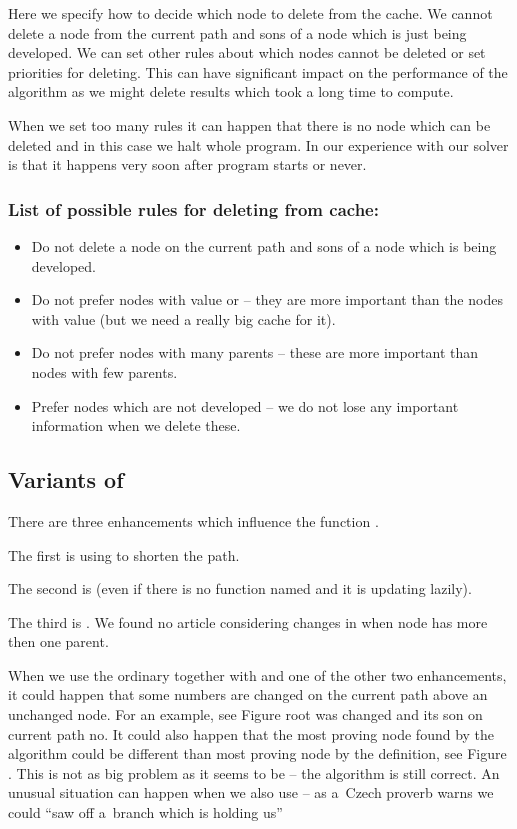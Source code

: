 Here we specify how to decide which node to delete from the cache. We cannot
delete a node from the current path and sons of a node which is just being
developed. We can set other rules about which nodes cannot be deleted or set
priorities for deleting. This can have significant impact on the performance of
the algorithm as we might delete results which took a long time to compute.

When we set too many rules it can happen that there is no node which can be
deleted and in this case we halt whole program. In our experience with our
solver is that it happens very soon after program starts or never.

\subsubsection{List of possible rules for deleting from cache:}
\begin{itemize}
\item Do not delete a node on the current path and sons of a node which is being developed.
\item Do not prefer nodes with value  or  -- they are 
      more important than the nodes with value  (but we need a really big
      cache for it).
\item Do not prefer nodes with many parents -- these are more important than nodes
      with few parents.
\item Prefer nodes which are not developed -- we do not lose any important information
      when we delete these. 
\end{itemize}

\subsection{Variants of }

There are three enhancements which influence the function . 

The first is using  to shorten the path. 

The second is  (even if there is no function named  and it is
updating lazily).

The third is . We found no article
considering changes in  when node has more then one parent.

When we use the ordinary  together with
 and one of the other two enhancements,
 it could happen that some numbers are changed on the current path
above an unchanged node. For an example, see Figure  root
was changed and its son on current path no. It could also happen that the most
proving node found by the algorithm could be different than most proving node
by the definition, see Figure . This is not as big problem as it seems to be -- the
algorithm is still correct. An unusual situation can happen when we also use
 -- as a~Czech proverb warns we could ``saw off
a~branch which is holding us''
 
